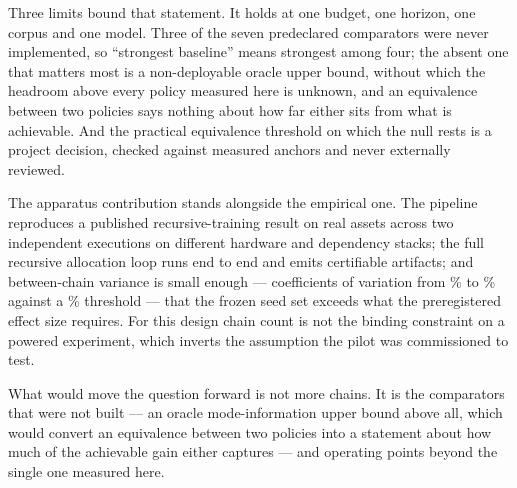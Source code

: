 Three limits bound that statement. It holds at one budget, one horizon, one corpus and one
model. Three of the seven predeclared comparators were never implemented, so ``strongest
baseline'' means strongest among four; the absent one that matters most is a non-deployable
oracle upper bound, without which the headroom above every policy measured here is unknown,
and an equivalence between two policies says nothing about how far either sits from what is
achievable. And the practical equivalence threshold on which the null rests is a project
decision, checked against measured anchors and never externally reviewed.

The apparatus contribution stands alongside the empirical one. The pipeline reproduces a
published recursive-training result on real assets across two independent executions on
different hardware and dependency stacks; the full recursive allocation loop runs end to end
and emits certifiable artifacts; and between-chain variance is small enough ---
coefficients of variation from \PilotCVLow\% to \PilotCVHigh\% against a
\PilotThresholdPct\% threshold --- that the frozen seed set exceeds what the preregistered
effect size requires. For this design chain count is not the binding constraint on a powered
experiment, which inverts the assumption the pilot was commissioned to test.

What would move the question forward is not more chains. It is the comparators that were
not built --- an oracle mode-information upper bound above all, which would convert an
equivalence between two policies into a statement about how much of the achievable gain
either captures --- and operating points beyond the single one measured here.
